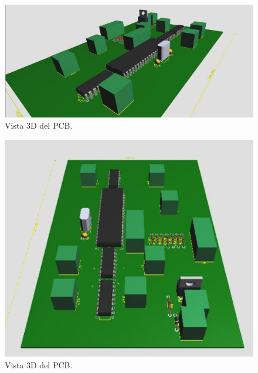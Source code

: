   \begin{figure}[!htbp]
 \centering
 \includegraphics [scale=0.35]
 {./img/seaperch_pcb_3d_01.png}
 \caption{Vista 3D del PCB.}
 \end{figure}

   \begin{figure}[!htbp]
 \centering
 \includegraphics [scale=0.45]
 {./img/seaperch_pcb_3d_02.png}
 \caption{Vista 3D del PCB.}
 \end{figure}

 \pagebreak

